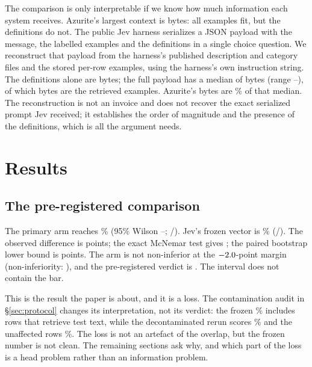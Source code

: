 \documentclass[11pt]{article}
\begin{document}
The comparison is only interpretable if we know how much information each
system receives. Azurite's largest context is \PLongBudget{} bytes: all
\PExamples{} examples fit, but the \PLabels{} definitions do not. The public Jev
harness serializes a JSON payload with the message, the labelled examples and
the \PLabels{} definitions in a single choice question. We reconstruct that
payload from the harness's published description and category files and the
stored per-row examples, using the harness's own instruction string. The
definitions alone are \PJevDefsBytes{} bytes; the full payload has a median of
\PJevPromptMedian{} bytes (range \PJevPromptMin--\PJevPromptMax), of which
\PJevExamplesMedian{} bytes are the retrieved examples. Azurite's \PLongBudget{}
bytes are \PAzuriteShare\% of that median. The reconstruction is not an invoice
and does not recover the exact serialized prompt Jev received; it establishes
the order of magnitude and the presence of the definitions, which is all the
argument needs.

\section{Results}

\subsection{The pre-registered comparison}

The primary arm reaches \PQueryTwoAcc\% (95\% Wilson
\PQueryTwoLo--\PQueryTwoHi; \PQueryTwoCorrect/\PN). Jev's frozen vector is
\PJevAcc\% (\PJevCorrect/\PN). The observed difference is \PQueryGap{} points;
the exact McNemar test gives \PQueryPText; the paired bootstrap lower bound is
\PQueryLower{} points. The arm is not non-inferior at the $-2.0$-point margin
(non-inferiority: \PQueryNonInf), and the pre-registered verdict is \textbf{\PQueryVerdict}. The
interval does not contain the bar.

This is the result the paper is about, and it is a loss. The contamination audit
in \S\ref{sec:protocol} changes its interpretation, not its verdict: the frozen
\PQueryTwoAcc\% includes \PContamEvalRows{} rows that retrieve test text, while
the decontaminated rerun scores \PCleanAcc\% and the unaffected rows
\PUnaffectedAcc\%. The loss is not an artefact of the overlap, but the frozen
number is not clean. The remaining sections ask why, and which part of the loss
is a head problem rather than an information problem.
\end{document}
